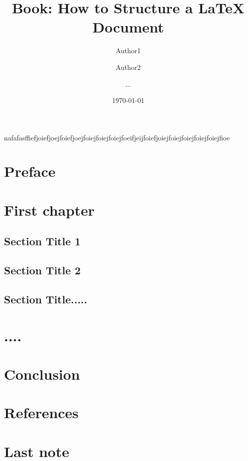 \documentclass[11pt,a4paper]{book}
\begin{document}
\title{Book: How to Structure a LaTeX Document}
\author{Author1 \and Author2 \and ...}
\date{\today}

\maketitle
nafafasffiefjoiefjoejfoiefjoejfoiejfoiejfoiejfoeifjeijfoiefjoiejfoiejfoiejfoiejfoiejfioe

\frontmatter

\chapter{Preface}

\mainmatter
\chapter{First chapter}
\section{Section Title 1}
\section{Section Title 2}
\section{Section Title.....}

\chapter{....}

\chapter{Conclusion}

\chapter*{References}


\backmatter
\chapter{Last note}
\end{document}
